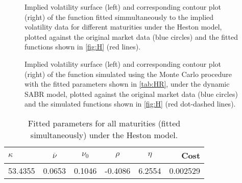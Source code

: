 \begin{figure}[H]
  \begin{subfigmatrix}{2}
  \end{subfigmatrix}
    \caption[Implied volatility surface and corresponding contour plot of the function fitted simmultaneously to the implied volatility data for different maturities under the Heston model, plotted against the original market data and the fitted functions shown in \autoref{fig:H}.]{Implied volatility surface (left) and corresponding contour plot (right) of the function fitted simmultaneously to the implied volatility data for different maturities under the Heston model, plotted against the original market data (blue circles) and the fitted functions shown in \autoref{fig:H} (red lines).}\label{fig:HS}
\end{figure}   


\begin{figure}[H]
  \begin{subfigmatrix}{2}
  \end{subfigmatrix}
    \caption[Implied volatility surface and corresponding contour plot of the function simulated using the Monte Carlo procedure with the fitted parameters shown in \autoref{tab:HR}, under the Heston model, plotted against the original market data and the simulated functions shown in \autoref{fig:H}.]{Implied volatility surface (left) and corresponding contour plot (right) of the function simulated using the Monte Carlo procedure with the fitted parameters shown in \autoref{tab:HR}, under the dynamic SABR model, plotted against the original market data (blue circles) and the simulated functions shown in \autoref{fig:H} (red dot-dashed lines).}\label{fig:HSSim}
\end{figure} 



\begin{table}[H]
    \centering
        \renewcommand{\arraystretch}{0.8}
\begin{tabular}{@{}lccccr@{}}
\toprule
$\kappa$ & $\overline{\nu}$ & $\nu_0$ & $\rho$ & $\eta$ & Cost \\ \midrule
53.4355 & 0.0653 & 0.1046 & -0.4086 & 6.2554 & 0.002529 \\
\bottomrule
\end{tabular}
  \caption[Fitted parameters for all maturities (fitted simultaneously) under the Heston model.]{Fitted parameters for all maturities (fitted simultaneously) under the Heston model.}
  \label{tab:HR}
\end{table}



